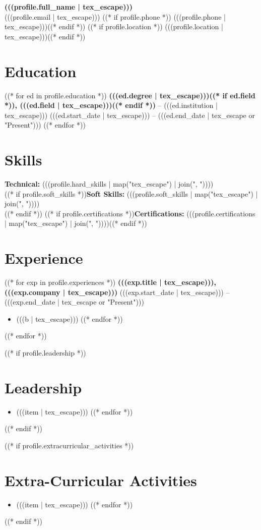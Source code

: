 \documentclass[10pt,letterpaper]{article}
\begin{document}
\begin{center}
    {\Huge\textbf{(((profile.full_name | tex_escape)))}}\\[2pt]
    (((profile.email | tex_escape))) ((* if profile.phone *))\,\textbar\,(((profile.phone | tex_escape)))((* endif *))
    ((* if profile.location *))\,\textbar\,(((profile.location | tex_escape)))((* endif *))
\end{center}

\section*{Education}
((* for ed in profile.education *))
\textbf{(((ed.degree | tex_escape)))((* if ed.field *)), (((ed.field | tex_escape)))((* endif *))} -- (((ed.institution | tex_escape))) \hfill (((ed.start_date | tex_escape))) -- (((ed.end_date | tex_escape or "Present")))
((* endfor *))

\section*{Skills}
\textbf{Technical:} (((profile.hard_skills | map("tex_escape") | join(", "))))\\
((* if profile.soft_skills *))\textbf{Soft Skills:} (((profile.soft_skills | map("tex_escape") | join(", "))))\\((* endif *))
((* if profile.certifications *))\textbf{Certifications:} (((profile.certifications | map("tex_escape") | join(", "))))((* endif *))

\section*{Experience}
((* for exp in profile.experiences *))
\textbf{(((exp.title | tex_escape))), (((exp.company | tex_escape)))} \hfill (((exp.start_date | tex_escape))) -- (((exp.end_date | tex_escape or "Present")))
\begin{itemize}
((* for b in exp.bullets *))
    \item (((b | tex_escape)))
((* endfor *))
\end{itemize}
((* endfor *))

((* if profile.leadership *))
\section*{Leadership}
\begin{itemize}
((* for item in profile.leadership *))
    \item (((item | tex_escape)))
((* endfor *))
\end{itemize}
((* endif *))

((* if profile.extracurricular_activities *))
\section*{Extra-Curricular Activities}
\begin{itemize}
((* for item in profile.extracurricular_activities *))
    \item (((item | tex_escape)))
((* endfor *))
\end{itemize}
((* endif *))
\end{document}
